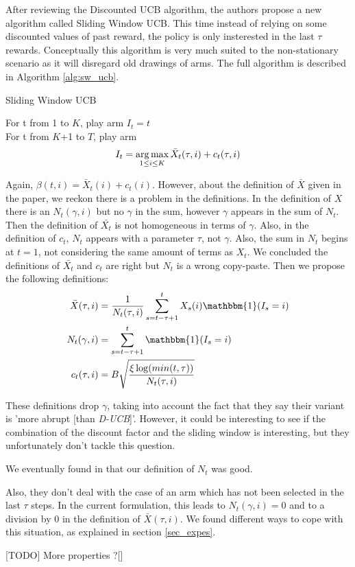 After reviewing the Discounted UCB algorithm, the authors propose a new algorithm called Sliding Window UCB. This time instead of relying on some discounted values of past reward, the policy is only insterested in the last $\tau$ rewards. Conceptually this algorithm is very much suited to the non-stationary scenario as it will disregard old drawings of arms. The full algorithm is described in Algorithm \ref{alg:sw_ucb}.\\

\begin{algorithm}
    \caption{Sliding Window UCB}
    \label{alg:sw_ucb}
    For t from 1 to $K$, play arm $I_t = t$ \\
    For t from $K$+1 to $T$, play arm 
    $$ I_t = \operatorname*{arg\,max}_{1\leq i \leq K} \bar X_t(\tau,i) + c_t(\tau,i)$$
\end{algorithm}

Again, $\beta(t,i)=\bar{X}_t(i)+c_t(i)$.
However, about the definition of $\bar{X}$ given in the paper, we reckon there is a problem in the definitions. In the definition of $X$ there is an $N_t(\gamma, i)$ but no $\gamma$ in the sum, however $\gamma$ appears in the sum of $N_t$. Then the definition of $\bar{X_t}$ is not homogeneous in terms of $\gamma$. Also, in the definition of $c_t$, $N_t$ appears with a parameter $\tau$, not $\gamma$. Also, the sum in $N_t$ begins at $t=1$, not considering the same amount of terms as $X_t$. We concluded the definitions of $\bar{X_t}$ and $c_t$ are right but $N_t$ is a wrong copy-paste. Then we propose the following definitions:
\begin{align}
\bar{X}(\tau, i) &= \frac{1}{N_t(\tau, i)}\sum_{s=t-\tau+1}^t X_s(i)\mathbbm{1}(I_s=i) \\
N_t(\gamma, i) &= \sum_{s=t-\tau+1}^t \mathbbm{1}(I_s=i) \\
c_t(\tau, i) &= B\sqrt{\frac{\xi \log(min(t, \tau))}{N_t(\tau,i)}}
\end{align}

These definitions drop $\gamma$, taking into account the fact that they say their variant is 'more abrupt [than \textit{D-UCB}]'. However, it could be interesting to see if the combination of the discount factor and the sliding window is interesting, but they unfortunately don't tackle this question.

We eventually found in \cite{slidesGarivier} that our definition of $N_t$ was good.

Also, they don't deal with the case of an arm which has not been selected in the last $\tau$ steps. In the current formulation, this leads to $N_t(\gamma, i)=0$ and to a division by $0$ in the definition of $\bar{X}(\tau, i)$. We found different ways to cope with this situation, as explained in section \ref{sec_expes}.

[TODO] More properties ?[]